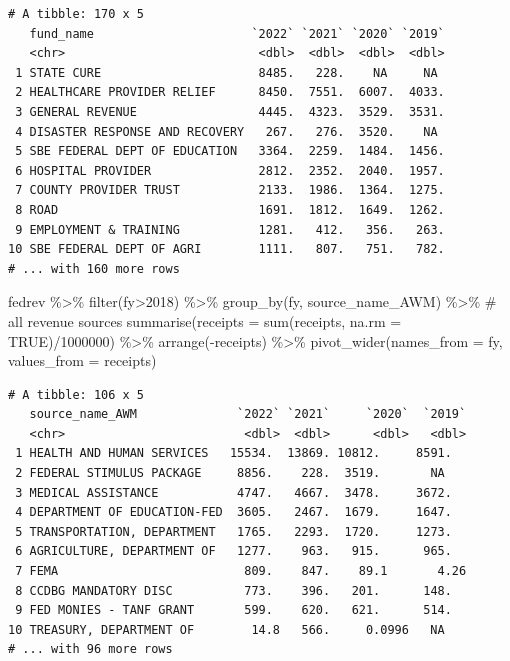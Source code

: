 \documentclass[
  letterpaper,
  DIV=11,
  numbers=noendperiod]{scrreport}
\newenvironment{Shaded}{\begin{snugshade}}{\end{snugshade}}
\newcommand{\AttributeTok}[1]{\textcolor[rgb]{0.40,0.45,0.13}{#1}}
\newcommand{\CommentTok}[1]{\textcolor[rgb]{0.37,0.37,0.37}{#1}}
\newcommand{\ConstantTok}[1]{\textcolor[rgb]{0.56,0.35,0.01}{#1}}
\newcommand{\DecValTok}[1]{\textcolor[rgb]{0.68,0.00,0.00}{#1}}
\newcommand{\FunctionTok}[1]{\textcolor[rgb]{0.28,0.35,0.67}{#1}}
\newcommand{\NormalTok}[1]{\textcolor[rgb]{0.00,0.23,0.31}{#1}}
\newcommand{\SpecialCharTok}[1]{\textcolor[rgb]{0.37,0.37,0.37}{#1}}
\begin{document}
\begin{verbatim}
# A tibble: 170 x 5
   fund_name                      `2022` `2021` `2020` `2019`
   <chr>                           <dbl>  <dbl>  <dbl>  <dbl>
 1 STATE CURE                      8485.   228.    NA     NA 
 2 HEALTHCARE PROVIDER RELIEF      8450.  7551.  6007.  4033.
 3 GENERAL REVENUE                 4445.  4323.  3529.  3531.
 4 DISASTER RESPONSE AND RECOVERY   267.   276.  3520.    NA 
 5 SBE FEDERAL DEPT OF EDUCATION   3364.  2259.  1484.  1456.
 6 HOSPITAL PROVIDER               2812.  2352.  2040.  1957.
 7 COUNTY PROVIDER TRUST           2133.  1986.  1364.  1275.
 8 ROAD                            1691.  1812.  1649.  1262.
 9 EMPLOYMENT & TRAINING           1281.   412.   356.   263.
10 SBE FEDERAL DEPT OF AGRI        1111.   807.   751.   782.
# ... with 160 more rows
\end{verbatim}

\begin{Shaded}
\begin{Highlighting}[]
\NormalTok{fedrev }\SpecialCharTok{\%\textgreater{}\%} 
  \FunctionTok{filter}\NormalTok{(fy}\SpecialCharTok{\textgreater{}}\DecValTok{2018}\NormalTok{) }\SpecialCharTok{\%\textgreater{}\%}
  \FunctionTok{group\_by}\NormalTok{(fy, source\_name\_AWM) }\SpecialCharTok{\%\textgreater{}\%}  \CommentTok{\# all revenue sources}
  \FunctionTok{summarise}\NormalTok{(}\AttributeTok{receipts =} \FunctionTok{sum}\NormalTok{(receipts, }\AttributeTok{na.rm =} \ConstantTok{TRUE}\NormalTok{)}\SpecialCharTok{/}\DecValTok{1000000}\NormalTok{) }\SpecialCharTok{\%\textgreater{}\%}
  \FunctionTok{arrange}\NormalTok{(}\SpecialCharTok{{-}}\NormalTok{receipts) }\SpecialCharTok{\%\textgreater{}\%}
  \FunctionTok{pivot\_wider}\NormalTok{(}\AttributeTok{names\_from =}\NormalTok{ fy, }\AttributeTok{values\_from =}\NormalTok{ receipts)}
\end{Highlighting}
\end{Shaded}

\begin{verbatim}
# A tibble: 106 x 5
   source_name_AWM              `2022` `2021`     `2020`  `2019`
   <chr>                         <dbl>  <dbl>      <dbl>   <dbl>
 1 HEALTH AND HUMAN SERVICES   15534.  13869. 10812.     8591.  
 2 FEDERAL STIMULUS PACKAGE     8856.    228.  3519.       NA   
 3 MEDICAL ASSISTANCE           4747.   4667.  3478.     3672.  
 4 DEPARTMENT OF EDUCATION-FED  3605.   2467.  1679.     1647.  
 5 TRANSPORTATION, DEPARTMENT   1765.   2293.  1720.     1273.  
 6 AGRICULTURE, DEPARTMENT OF   1277.    963.   915.      965.  
 7 FEMA                          809.    847.    89.1       4.26
 8 CCDBG MANDATORY DISC          773.    396.   201.      148.  
 9 FED MONIES - TANF GRANT       599.    620.   621.      514.  
10 TREASURY, DEPARTMENT OF        14.8   566.     0.0996   NA   
# ... with 96 more rows
\end{verbatim}
\end{document}
